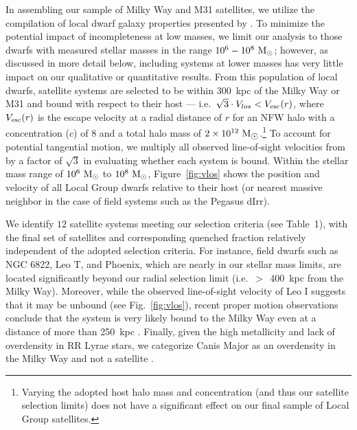 \documentclass[usenatbib]{mn2e}
\newcommand{\msun}{{\rm M}_{\odot}}
\begin{document}
In assembling our sample of Milky Way and M31 satellites, we utilize
the compilation of local dwarf galaxy properties presented by
\citet{mcconnachie12}. To minimize the potential impact of
incompleteness at low masses, we limit our analysis to those dwarfs
with measured stellar masses in the range $10^{6}-10^{8}~\msun$;
however, as discussed in more detail below, including systems at lower
masses has very little impact on our qualitative or quantitative
results. From this population of local dwarfs, satellite systems are
selected to be within $300$~kpc of the Milky Way or M31 and bound with
respect to their host --- i.e.~$\sqrt{3} \cdot V_{los} < V_{\rm
  esc}(r)$, where $V_{\rm esc}(r)$ is the escape velocity at a radial
distance of $r$ for an NFW halo with a concentration ($c$) of $8$ and
a total halo mass of $2\times 10^{12}\ \rm M_{\hbox{$\odot$}}$.\footnote{Varying
  the adopted host halo mass and concentration (and thus our satellite
  selection limits) does not have a significant effect on our final
  sample of Local Group satellites.} To account for potential
tangential motion, we multiply all observed line-of-sight velocities
from \citet{mcconnachie12} by a factor of $\sqrt{3}$ in evaluating
whether each system is bound. Within the stellar mass range of
$10^{6}~\msun$ to $10^{8}~\msun$, Figure~\ref{fig:vlos} shows the
position and velocity of all Local Group dwarfs relative to their host
(or nearest massive neighbor in the case of field systems such as the
Pegasus dIrr).


We identify $12$ satellite systems meeting our selection criteria (see
Table~1), with the final set of satellites and
corresponding quenched fraction relatively independent of the adopted
selection criteria. For instance, field dwarfs such as NGC 6822, Leo
T, and Phoenix, which are nearly in our stellar mass limits, are
located significantly beyond our radial selection limit
(i.e.~$>~\!\!\!~400$~kpc from the Milky Way). Moreover, while the
observed line-of-sight velocity of Leo I suggests that it may be
unbound (see Fig.~\ref{fig:vlos}), recent proper motion observations
conclude that the system is very likely bound to the Milky Way even at
a distance of more than 250~kpc \citep{sohn13, bk13}. Finally, given
the high metallicity and lack of overdensity in RR Lyrae stars, we
categorize Canis Major as an overdensity in the Milky Way and not a
satellite \citep[][but see also \citealt{md05}]{momany04, butler07,
  mateu09}.
\end{document}
